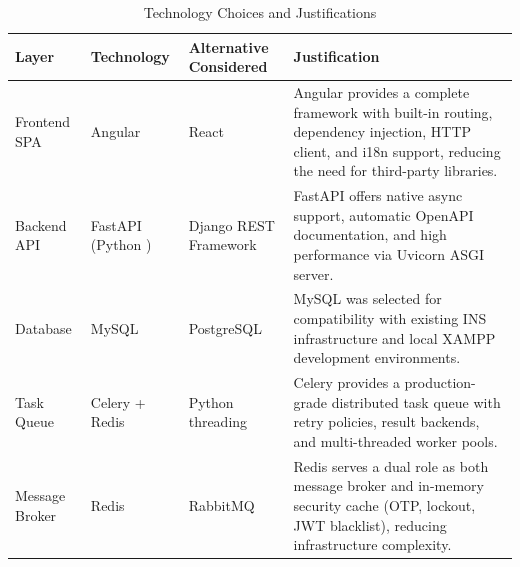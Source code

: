 \documentclass[12pt,a4paper]{report}
\begin{document}
\begin{table}[H]
\centering
\caption{Technology Choices and Justifications}
\label{tab:tech_choices}
\vspace{0.3cm}
\renewcommand{\arraystretch}{1.3}
\small
\begin{tabular}{|p{2.8cm}|p{3cm}|p{3.5cm}|p{5.5cm}|}
\hline
\textbf{Layer} & \textbf{Technology} & \textbf{Alternative Considered} & \textbf{Justification} \\ \hline
Frontend SPA & Angular \cite{angular} & React & Angular provides a complete framework with built-in routing, dependency injection, HTTP client, and i18n support, reducing the need for third-party libraries. \\ \hline
Backend API & FastAPI \cite{fastapi} (Python \cite{python}) & Django REST Framework & FastAPI offers native async support, automatic OpenAPI documentation, and high performance via Uvicorn ASGI server. \\ \hline
Database & MySQL \cite{mysql} & PostgreSQL & MySQL was selected for compatibility with existing INS infrastructure and local XAMPP development environments. \\ \hline
Task Queue & Celery \cite{celery} + Redis \cite{redis} & Python threading & Celery provides a production-grade distributed task queue with retry policies, result backends, and multi-threaded worker pools. \\ \hline
Message Broker & Redis \cite{redis} & RabbitMQ & Redis serves a dual role as both message broker and in-memory security cache (OTP, lockout, JWT blacklist), reducing infrastructure complexity. \\ \hline
\end{tabular}
\end{table}
\end{document}
